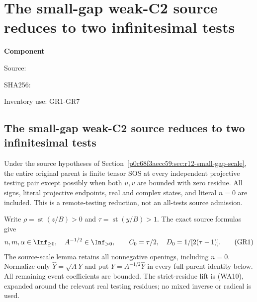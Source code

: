 \chapter{The small-gap weak-C2 source reduces to two infinitesimal tests}
\label{component:pbb649976abc6}
\noindent\textbf{Component }\par
{\small\noindent Source: \par}
{\small\noindent SHA256: \par}
{\small\noindent Inventory use: GR1-GR7\par}
\medskip
\section{The small-gap weak-C2 source reduces to two infinitesimal tests}
\label{pbb649976abc6:sec:r12-small-gap-remote}
\begin{theorem}
Under the source hypotheses of Section~\ref{p0c68f3aecc59:sec:r12-small-gap-scale},
the entire original parent is finite tensor SOS at every independent
projective testing pair except possibly when both $u,v$ are bounded
with zero residue. All signs, literal projective endpoints, real and
complex states, and literal $n=0$ are included. This is a remote-testing
reduction, not an all-tests source admission.
\end{theorem}
Write $\rho=\operatorname{st}(z/B)>0$ and
$\tau=\operatorname{st}(y/B)>1$. The exact source formulas give
\[
 n,m,\alpha\in\Inf_{\ge0},\quad A^{-1/2}\in\Inf_{>0},
 \qquad C_0=\tau/2,\quad D_0=1/[2(\tau-1)].             \tag{GR1}
\]
The source-scale lemma retains all nonnegative openings, including
$n=0$. Normalize only $\widehat Y=\sqrt A Y$ and put
$Y=A^{-1/2}\widehat Y$ in every full-parent identity below.
All remaining event coefficients are bounded. The strict-residue
lift is (WA10), expanded around the relevant real testing residues;
no mixed inverse or radical is used.

